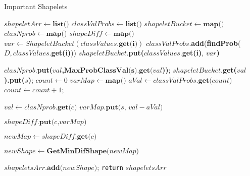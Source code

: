 \documentclass{article}
\begin{document}
\begin{algorithm}
\caption{Important Shapelets}\label{euclid}
\begin{algorithmic}[1]
\newcommand{\Map}{\textbf{map()}}
\newcommand{\List}{\textbf{list()}}
\State $shapeletArr \gets \List$
\State $classValProbs \gets \List$
\State $shapeletBucket \gets \Map$
\State $clasNprob \gets \Map$
\State $shapeDiff \gets \Map$
	\State $var \gets ShapeletBucket(classValues.\textbf {get(i)})$
    \State $classValProbs$.\textbf{add}(\textbf{findProb}($D, classValues$.\textbf {get(i)}))
    \State $shapeletBucket$.\textbf{put(}$classValues.$\textbf {get(i)}, $var$\textbf{)}
\EndFor

          

	         \State $clasNprob$.\textbf{put($val$,$ \textbf{MaxProbClassVal(s).get($val$}$))};
	         \State $shapeletBucket$.\textbf{get($val$).put($s$)};
	         \EndFor
\EndFor
\State $count \gets 0$
            \State $varMap \gets \Map $
            \State $aVal \gets classValProbs.\textbf{get($count$)}$
            \State $count \gets count +1$;

                \State $val  \gets clasNprob.\textbf{get($c$)}$
                \State $varMap.\textbf{put($s$, $val - aVal$)}$
            
            \State $shapeDiff.\textbf{put($c$,$varMap$)}$

            \State $newMap \gets shapeDiff.\textbf{get($c$)}$

            \State $newShape \gets \textbf{GetMinDifShape($newMap$)}$

            \State $shapeletsArr.\textbf{add($newShape$)}$;
            \EndFor
\EndFor
\State \texttt {return} $shapeletsArr$ 
\EndProcedure
\end{algorithmic}

\end{algorithm}
\end{document}
